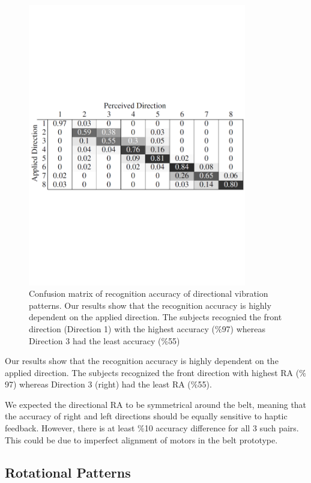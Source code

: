 \begin{figure}[ht!]
\centering
\includegraphics[width=0.85\textwidth]{pics/vibration_pattern_conf_matrix_cropped}
\caption{Confusion matrix of recognition accuracy of directional vibration patterns. Our results show that the recognition accuracy is highly dependent on the applied direction. The subjects recognied the front direction (Direction 1) with the highest accuracy ($\%$97) whereas Direction 3 had the least accuracy ($\%$55)}
\label{fig:vibration_pattern_conf_matrix}
\end{figure}

Our results show that the recognition accuracy is highly dependent on the applied direction. The subjects recognized the front direction with highest RA ($\%$97) whereas Direction 3 (right) had the least RA ($\%$55).

We expected the directional RA to be symmetrical around the belt, meaning that the accuracy of right and left directions should be equally sensitive to haptic feedback. However, there is at least $\%$10 accuracy difference for all 3 such pairs. This could be due to imperfect alignment of motors in the belt prototype.

\subsection{Rotational Patterns}

